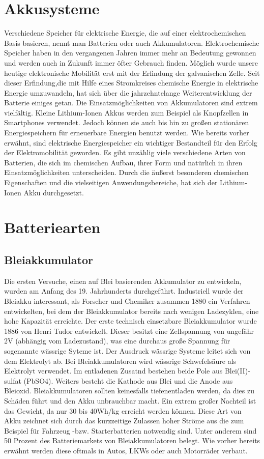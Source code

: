 \section{Akkusysteme}
Verschiedene Speicher für elektrische Energie, die auf einer elektrochemischen Basis basieren, nennt man Batterien oder auch Akkumulatoren. Elektrochemische Speicher haben in den vergangenen Jahren immer mehr an Bedeutung gewonnen und werden auch in Zukunft immer öfter Gebrauch finden. Möglich wurde unsere heutige elektronische Mobilität erst mit der Erfindung der galvanischen Zelle. Seit dieser Erfindung,die mit Hilfe eines Stromkreises chemische Energie in elektrische Energie umzuwandeln, hat sich über die jahrzehntelange Weiterentwicklung der Batterie einiges getan. Die Einsatzmöglichkeiten von Akkumulatoren sind extrem vielfältig. Kleine Lithium-Ionen Akkus werden zum Beispiel als Knopfzellen in Smartphones verwendet. Jedoch können sie auch bis hin zu großen stationären Energiespeichern für erneuerbare Energien benutzt werden. Wie bereits vorher erwähnt, sind elektrische Energiespeicher ein wichtiger Bestandteil für den Erfolg der Elektromobilität geworden. Es gibt unzählig viele verschiedene Arten von Batterien, die sich im chemischen Aufbau, ihrer Form und natürlich in ihren Einsatzmöglichkeiten unterscheiden. Durch die äußerst besonderen chemischen Eigenschaften und die vielseitigen Anwendungsbereiche, hat sich der Lithium-Ionen Akku durchgesetzt.
\newpage

\section{Batteriearten}

\subsection{Bleiakkumulator}
Die ersten Versuche, einen auf Blei basierenden Akkumulator zu entwickeln, wurden am Anfang des 19. Jahrhunderts durchgeführt. Industriell wurde der Bleiakku interessant, als Forscher und Chemiker zusammen 1880 ein Verfahren entwickelten, bei dem der Bleiakkumulator bereits nach wenigen Ladezyklen, eine hohe Kapazität erreichte. Der erste technisch einsetzbare Bleiakkumulator wurde 1886 von Henri Tudor entwickelt. Dieser besitzt eine Zellspannung von ungefähr 2V (abhängig vom Ladezustand), was eine durchaus große Spannung für sogenannte wässrige Syteme ist. Der Ausdruck wässrige Systeme leitet sich von dem Elektrolyt ab. Bei Bleiakkumulatoren wird wässrige Schwefelsäure als Elektrolyt verwendet. Im entladenen Zusatnd bestehen beide Pole aus Blei(II)-sulfat (PbSO4). Weiters besteht die Kathode aus Blei und die Anode aus Bleioxid. Bleiakkumulatoren sollten keinesfalls tiefenentladen werden, da dies zu Schäden führt und den Akku unbrauchbar macht. Ein extrem großer Nachteil ist das Gewicht, da nur 30 bis 40Wh/kg erreicht werden können.
Diese Art von Akku zeichnet sich durch das kurzzeitige Zulassen hoher Ströme aus die zum Beispiel für Fahrzeug -bzw. Starterbatterien notwendig sind. Unter anderem sind 50 Prozent des Batteriemarkets von Bleiakkumulatoren belegt. Wie vorher bereits erwähnt werden diese oftmals in Autos, LKWs oder auch Motorräder verbaut.

